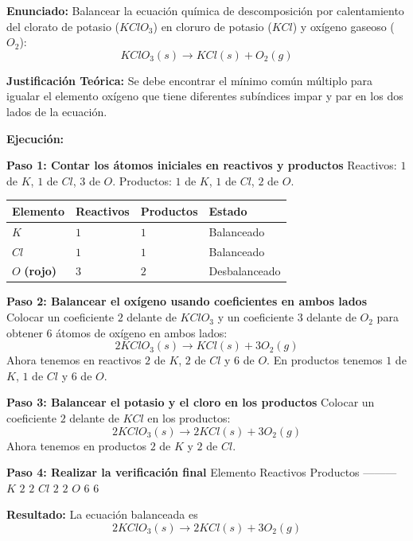 \documentclass[
  spanish,
  letterpaper,
  12pt,
  oneside,
  open=any]{scrbook}
\newcounter{none} %
\begin{document}
\textbf{Enunciado:} Balancear la ecuación química de descomposición por
calentamiento del clorato de potasio (\(KClO_3\)) en cloruro de potasio
(\(KCl\)) y oxígeno gaseoso (\(O_2\)):
\[K{Cl}O_3(s) \rightarrow K{Cl}(s) + O_2(g)\]

\textbf{Justificación Teórica:} Se debe encontrar el mínimo común
múltiplo para igualar el elemento oxígeno que tiene diferentes
subíndices impar y par en los dos lados de la ecuación.

\textbf{Ejecución:}

\textbf{Paso 1: Contar los átomos iniciales en reactivos y productos}
Reactivos: \(1\) de \(K\), \(1\) de \(Cl\), \(3\) de \(O\). Productos:
\(1\) de \(K\), \(1\) de \(Cl\), \(2\) de \(O\).

{\def\LTcaptype{none} %
\begin{longtable}[]{@{}llll@{}}
\toprule\noalign{}
Elemento & Reactivos & Productos & Estado \\
\midrule\noalign{}
\endhead
\bottomrule\noalign{}
\endlastfoot
\(K\) & \(1\) & \(1\) & Balanceado \\
\(Cl\) & \(1\) & \(1\) & Balanceado \\
\(O\) \textbf{(rojo)} & \(3\) & \(2\) & Desbalanceado \\
\end{longtable}
}

\textbf{Paso 2: Balancear el oxígeno usando coeficientes en ambos lados}
Colocar un coeficiente \(2\) delante de \(K{Cl}O_3\) y un coeficiente
\(3\) delante de \(O_2\) para obtener \(6\) átomos de oxígeno en ambos
lados: \[2K{Cl}O_3(s) \rightarrow K{Cl}(s) + 3O_2(g)\] Ahora tenemos en
reactivos \(2\) de \(K\), \(2\) de \(Cl\) y \(6\) de \(O\). En productos
tenemos \(1\) de \(K\), \(1\) de \(Cl\) y \(6\) de \(O\).

\textbf{Paso 3: Balancear el potasio y el cloro en los productos}
Colocar un coeficiente \(2\) delante de \(K{Cl}\) en los productos:
\[2K{Cl}O_3(s) \rightarrow 2K{Cl}(s) + 3O_2(g)\] Ahora tenemos en
productos \(2\) de \(K\) y \(2\) de \(Cl\).

\textbf{Paso 4: Realizar la verificación final} \textbar{} Elemento
\textbar{} Reactivos \textbar{} Productos \textbar{}
\textbar---\textbar---\textbar---\textbar{} \textbar{} \(K\) \textbar{}
\(2\) \textbar{} \(2\) \textbar{} \textbar{} \(Cl\) \textbar{} \(2\)
\textbar{} \(2\) \textbar{} \textbar{} \(O\) \textbar{} \(6\) \textbar{}
\(6\) \textbar{}

\textbf{Resultado:} La ecuación balanceada es
\[2K{Cl}O_3(s) \rightarrow 2K{Cl}(s) + 3O_2(g)\]
\end{document}
